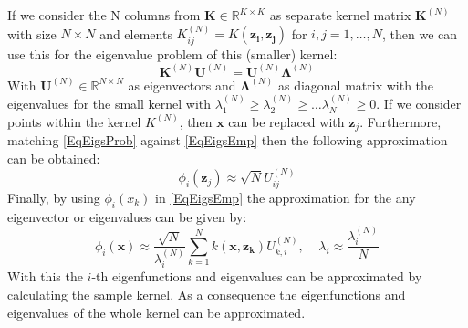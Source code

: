 If we consider the N columns from $\mathbf{K} \in \mathbb{R}^{K\times K}$ as separate kernel matrix $\mathbf{K}^{(N)}$ with size $N\times N$ and elements $K_{ij}^{(N)}=K(\mathbf{z_i,z_j})$ for $i,j=1,\dots,N$, then we can use this for the eigenvalue problem of this (smaller) kernel:\cite{Williams.2000}
\begin{equation}\label{EqEigsProb}
	\mathbf{K}^{(N)}\mathbf{U}^{(N)} = \mathbf{U}^{(N)}\mathbf{\Lambda}^{(N)}
\end{equation} 
With $\mathbf{U}^{(N)} \in \mathbb{R}^{N\times N}$ as eigenvectors and $\boldsymbol{\Lambda}^{(N)}$ as diagonal matrix with the eigenvalues for the small kernel with $\lambda_1^{(N)}\ge\lambda_2^{(N)}\ge\dots\lambda_N^{(N)} \ge0$.
If we consider points within the kernel $K^{(N)}$, then $\mathbf{x}$ can be replaced with $\mathbf{z}_j$.
Furthermore, matching \eqref{EqEigsProb} against \eqref{EqEigsEmp} then the following approximation can be obtained:\cite{Williams.2000}
\begin{equation}\label{EqEigsFuncAprox}
	\phi_i(\mathbf{z}_j) \approx \sqrt{N}U_{ij}^{(N)}
\end{equation}
Finally, by using $\phi_i(x_k)$ in \eqref{EqEigsEmp} the approximation for the any eigenvector or eigenvalues can be given by:
\begin{equation}\label{EqEigsValAprox}
	\phi_i(\mathbf{x})\approx\frac{\sqrt{N}}{\lambda_i^{(N)}}\sum_{k=1}^{N}k(\mathbf{x},\mathbf{z_k})U_{k,i}^{(N)}, \>\>\>\>\> \lambda_i \approx \frac{\lambda_i^{(N)}}{N}
\end{equation}
With this the $i$-th eigenfunctions and eigenvalues can be approximated by calculating the sample kernel.\cite{Williams.2000}
As a consequence the eigenfunctions and eigenvalues of the whole kernel can be approximated.
